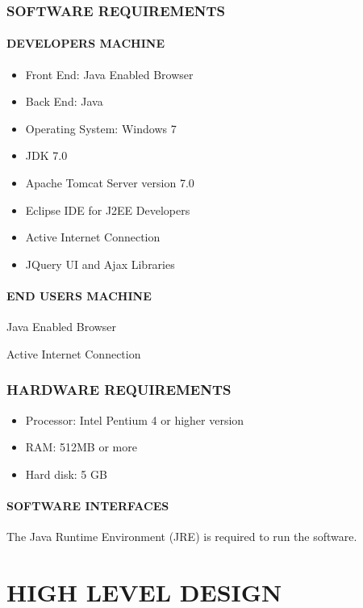 \documentclass[12pt]{report}
\begin{document}
\subsection{SOFTWARE REQUIREMENTS}
\subsubsection{DEVELOPERS MACHINE}
\begin{itemize}
\item{	Front End: Java Enabled Browser }
\item{	Back End: Java }
\item{	Operating System: Windows 7 }
\item{JDK 7.0} 
\item{ Apache Tomcat Server version 7.0 }
\item {Eclipse IDE for J2EE Developers}
\item Active Internet Connection
\item JQuery UI and Ajax Libraries
\end{itemize}
\subsubsection{END USERS MACHINE}
\item {Java Enabled Browser }
\item { Active Internet Connection }
\subsection{HARDWARE REQUIREMENTS}
\begin{itemize}
\item{Processor: Intel Pentium 4 or higher version}
\item{RAM: 512MB or more}
\item{Hard disk: 5 GB}
\end{itemize}
\subsubsection{SOFTWARE INTERFACES }
The Java Runtime Environment (JRE) is required to run the software.
\pagestyle{fancy}
\chead{}
\rfoot{\small{\thepage}}
\renewcommand{\headrulewidth}{0.4pt}
\renewcommand{\footrulewidth}{0.4pt}
\chapter{HIGH LEVEL DESIGN}
\end{document}
